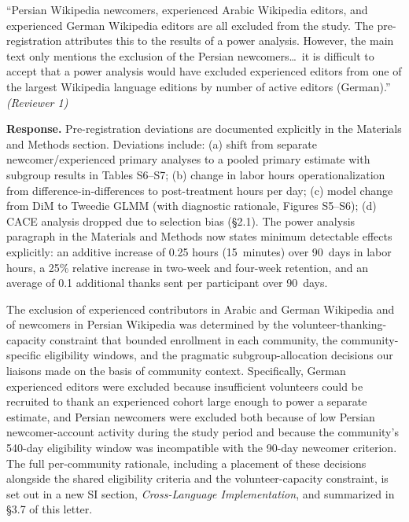 \documentclass[12pt]{article}
\newenvironment{reviewquote}{%
  \def\FrameCommand{{\color{quotebarcolor}\vrule width 2pt}\colorbox{quotebg}}%
  \MakeFramed{\advance\hsize-\width \FrameRestore}%
  \small
}{%
  \endMakeFramed
}
\begin{document}
\begin{reviewquote}
``Persian Wikipedia newcomers, experienced Arabic Wikipedia editors, and experienced German Wikipedia editors are all excluded from the study. The pre-registration attributes this to the results of a power analysis. However, the main text only mentions the exclusion of the Persian newcomers\ldots\ it is difficult to accept that a power analysis would have excluded experienced editors from one of the largest Wikipedia language editions by number of active editors (German).'' \textit{(Reviewer 1)}
\end{reviewquote}

\textbf{Response.} Pre-registration deviations are documented explicitly in the Materials and Methods section. Deviations include: (a) shift from separate newcomer/experienced primary analyses to a pooled primary estimate with subgroup results in Tables S6--S7; (b) change in labor hours operationalization from difference-in-differences to post-treatment hours per day; (c) model change from DiM to Tweedie GLMM (with diagnostic rationale, Figures S5--S6); (d) CACE analysis dropped due to selection bias (\S2.1). The power analysis paragraph in the Materials and Methods now states minimum detectable effects explicitly: an additive increase of 0.25 hours (15~minutes) over 90~days in labor hours, a 25\% relative increase in two-week and four-week retention, and an average of 0.1 additional thanks sent per participant over 90~days.

The exclusion of experienced contributors in Arabic and German Wikipedia and of newcomers in Persian Wikipedia was determined by the volunteer-thanking-capacity constraint that bounded enrollment in each community, the community-specific eligibility windows, and the pragmatic subgroup-allocation decisions our liaisons made on the basis of community context. Specifically, German experienced editors were excluded because insufficient volunteers could be recruited to thank an experienced cohort large enough to power a separate estimate, and Persian newcomers were excluded both because of low Persian newcomer-account activity during the study period and because the community's 540-day eligibility window was incompatible with the 90-day newcomer criterion. The full per-community rationale, including a placement of these decisions alongside the shared eligibility criteria and the volunteer-capacity constraint, is set out in a new SI section, \textit{Cross-Language Implementation}, and summarized in \S3.7 of this letter.
\end{document}
